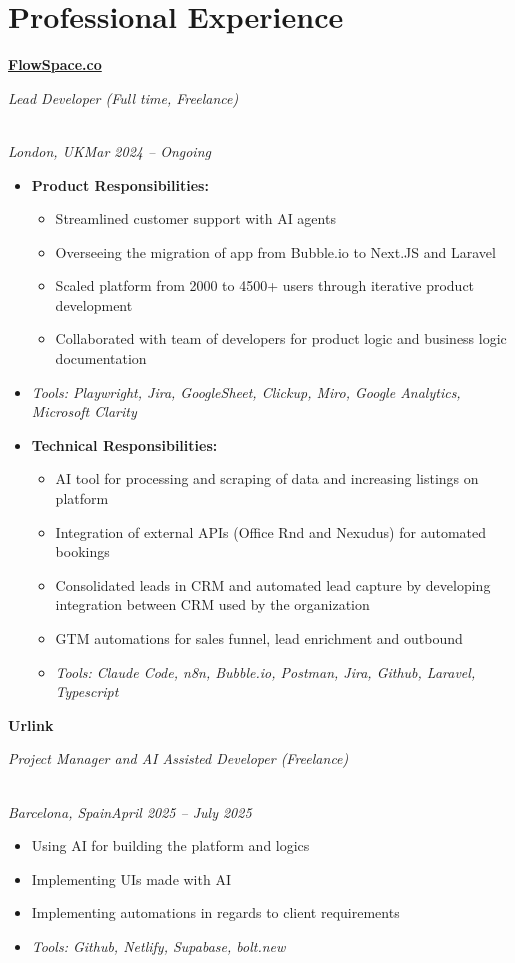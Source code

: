 \documentclass[a4paper,10pt]{article}
\newcommand{\role}[4]{\vspace{3pt}\noindent\hspace{0.6em}\parbox[t]{0.38\textwidth}{\raggedright\textbf{#1}}\hfill\parbox[t]{0.58\textwidth}{\raggedleft\textit{#2}}\\{\textit{#3}\hfill\textit{#4}}\vspace{1pt}}
\begin{document}
\section{Professional Experience}
\role{\href{https://flowspace.co}{FlowSpace.co}}{Lead Developer (Full time, Freelance)}{London, UK}{Mar 2024 -- Ongoing}
\begin{itemize}
\item \textbf{Product Responsibilities:}
\begin{itemize}[label=--]
\item Streamlined customer support with AI agents
\item Overseeing the migration of app from Bubble.io to Next.JS and Laravel
\item Scaled platform from 2000 to 4500+ users through iterative product development
\item Collaborated with team of developers for product logic and business logic documentation
\end{itemize}
\item \textit{Tools: Playwright, Jira, GoogleSheet, Clickup, Miro, Google Analytics, Microsoft Clarity}
\item \textbf{Technical Responsibilities:}
\begin{itemize}[label=--]
\item AI tool for processing and scraping of data and increasing listings on platform
\item Integration of external APIs (Office Rnd and Nexudus) for automated bookings
\item Consolidated leads in CRM and automated lead capture by developing integration between CRM used by the organization
\item GTM automations for sales funnel, lead enrichment and outbound
\item \textit{Tools: Claude Code, n8n, Bubble.io, Postman, Jira, Github, Laravel, Typescript}
\end{itemize}
\end{itemize}

\role{Urlink}{Project Manager and AI Assisted Developer (Freelance)}{Barcelona, Spain}{April 2025 -- July 2025}
\begin{itemize}
\item Using AI for building the platform and logics
\item Implementing UIs made with AI
\item Implementing automations in regards to client requirements
\item \textit{Tools: Github, Netlify, Supabase, bolt.new}
\end{itemize}
\end{document}
